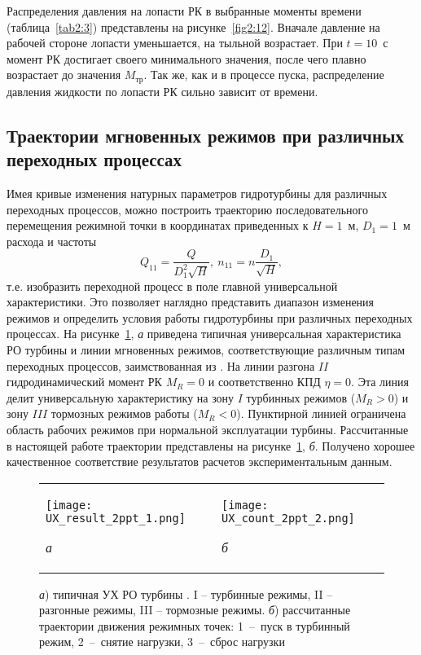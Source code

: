 Распределения давления на лопасти РК в выбранные моменты времени (таблица~\ref{tab2:3}) 
представлены на рисунке~\ref{fig2:12}. 
Вначале давление на рабочей стороне лопасти уменьшается, на тыльной возрастает. При $t=10$~с момент РК 
достигает своего минимального значения, после чего плавно возрастает до значения $M_{\text{тр}}$.
Так же, как и в процессе пуска, распределение давления жидкости по лопасти РК сильно зависит от времени. 
\vspace{-5mm}
\subsection{Траектории мгновенных режимов при различных переходных процессах}
Имея кривые изменения натурных параметров гидротурбины для различных переходных процессов, можно построить 
траекторию последовательного перемещения режимной точки в координатах приведенных к $H=1$~м, $D_1=1$~м расхода 
и частоты \vspace{-3mm}
$$
  Q_{11}=\frac{Q}{D_1^2\sqrt{H}},\ n_{11}=n\frac{D_1}{\sqrt{H}},
$$
т.е. изобразить переходной процесс в поле главной универсальной характеристики. Это позволяет наглядно 
представить диапазон изменения режимов и определить условия работы гидротурбины при различных переходных 
процессах. На рисунке~\ref{fig2:15}, \emph{а} приведена типичная универсальная характеристика РО турбины и линии 
мгновенных режимов, соответствующие различным типам переходных процессов, заимствованная из \cite{krivch}. На 
линии разгона $II$ гидродинамический момент РК $M_R=0$ и соответственно КПД 
$\eta = 0$. Эта линия делит универсальную характеристику на зону $I$ турбинных режимов ($M_R>0$) и зону $III$ 
тормозных режимов работы ($M_R<0$). Пунктирной линией ограничена область рабочих режимов при нормальной 
эксплуатации турбины. Рассчитанные в настоящей работе траектории представлены на 
рисунке~\ref{fig2:15}, \emph{б}. 
Получено хорошее качественное соответствие результатов расчетов экспериментальным данным. \vspace{-3mm}
\begin{figure}[!h]
  \begin{tabular}{p{8.0cm}p{8.0cm}}
  \centering
  \texttt{[image: UX\_result\_2ppt\_1.png]}\par \vspace{-4mm}
  \centering \emph{а}& \centering
  \texttt{[image: UX\_count\_2ppt\_2.png]}\par \vspace{-4mm}
  \centering \emph{б}
  \end{tabular} \vspace{-5mm}
  \caption{\emph{а}) типичная УХ РО турбины \cite{krivch}. I -- турбинные режимы, II -- разгонные режимы, 
  III -- тормозные режимы. \emph{б}) рассчитанные траектории движения режимных точек: 1~--~пуск в турбинный 
  режим, 2~--~снятие нагрузки, 3~--~сброс нагрузки} \vspace{-5mm}
  \label{fig2:15}
\end{figure}
%
 